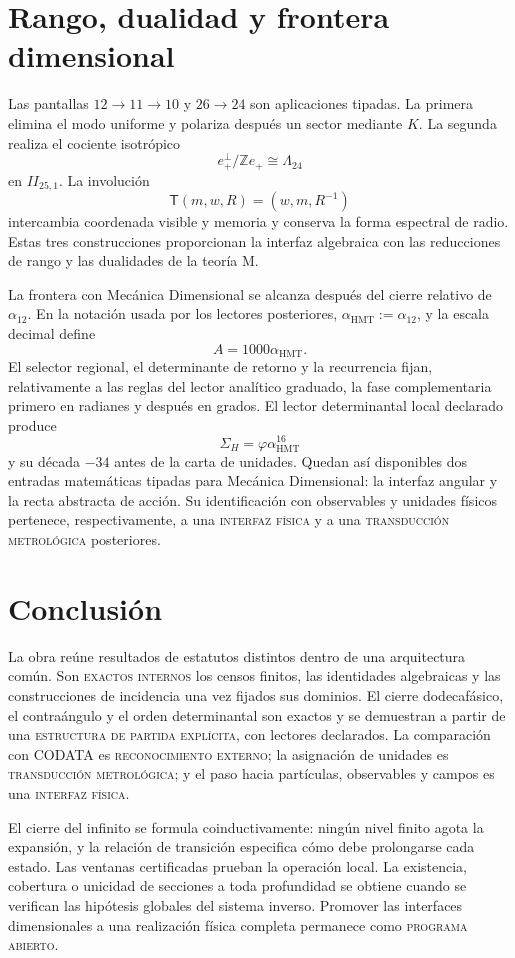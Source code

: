\section{Rango, dualidad y frontera dimensional}

Las pantallas \(12\to11\to10\) y \(26\to24\) son aplicaciones tipadas. La
primera elimina el modo uniforme y polariza después un sector mediante
\(K\). La segunda realiza el cociente isotrópico
\[
e_+^\perp/\mathbb Ze_+\cong\Lambda_{24}
\]
en \(II_{25,1}\). La involución
\[
\mathsf T(m,w,R)=(w,m,R^{-1})
\]
intercambia coordenada visible y memoria y conserva la forma espectral de
radio. Estas tres construcciones proporcionan la interfaz algebraica con las
reducciones de rango y las dualidades de la teoría M.

La frontera con Mecánica Dimensional se alcanza después del cierre relativo
de \(\alpha_{12}\). En la notación usada por los lectores posteriores,
\(\alpha_{\mathrm{HMT}}:=\alpha_{12}\), y la escala decimal define
\[
A=1000\alpha_{\mathrm{HMT}}.
\]
El selector regional, el determinante de retorno y la recurrencia fijan,
relativamente a las reglas del lector analítico graduado, la fase
complementaria primero en radianes y después en grados. El lector
determinantal local declarado produce
\[
\Sigma_H=\varphi\alpha_{\mathrm{HMT}}^{16}
\]
y su década \(-34\) antes de la carta de unidades. Quedan así disponibles dos
entradas matemáticas tipadas para Mecánica Dimensional: la interfaz angular y
la recta abstracta de acción. Su identificación con observables y unidades
físicos pertenece, respectivamente, a una \textsc{interfaz física} y a una
\textsc{transducción metrológica} posteriores.

\section{Conclusión}

La obra reúne resultados de estatutos distintos dentro de una arquitectura
común. Son \textsc{exactos internos} los censos finitos, las identidades
algebraicas y las construcciones de incidencia una vez fijados sus dominios.
El cierre dodecafásico, el contraángulo y el orden determinantal son exactos y
se demuestran a partir de una \textsc{estructura de partida explícita}, con
lectores declarados. La comparación con
CODATA es \textsc{reconocimiento externo}; la asignación de unidades es
\textsc{transducción metrológica}; y el paso hacia partículas, observables y
campos es una \textsc{interfaz física}.

El cierre del infinito se formula coinductivamente: ningún nivel finito agota
la expansión, y la relación de transición especifica cómo debe prolongarse
cada estado. Las ventanas certificadas prueban la operación local. La
existencia, cobertura o unicidad de secciones a toda profundidad se obtiene
cuando se verifican las hipótesis globales del sistema inverso. Promover las
interfaces dimensionales a una realización física completa permanece como
\textsc{programa abierto}.
